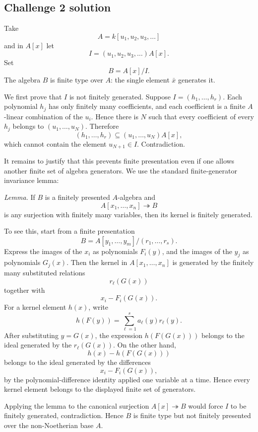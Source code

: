 \subsection*{Challenge 2 solution}
\begin{solution}
Take
\[
A=k[u_1,u_2,u_3,\ldots]
\]
and in \(A[x]\) let
\[
I=(u_1,u_2,u_3,\ldots)A[x].
\]
Set
\[
B=A[x]/I.
\]
The algebra \(B\) is finite type over \(A\): the single element \(\bar x\) generates it.

We first prove that \(I\) is not finitely generated.  Suppose \(I=(h_1,\ldots,h_r)\).  Each
polynomial \(h_j\) has only finitely many coefficients, and each coefficient is a finite
\(A\)-linear combination of the \(u_i\).  Hence there is \(N\) such that every coefficient of every
\(h_j\) belongs to \((u_1,\ldots,u_N)\).  Therefore
\[
(h_1,\ldots,h_r)\subseteq (u_1,\ldots,u_N)A[x],
\]
which cannot contain the element \(u_{N+1}\in I\).  Contradiction.

It remains to justify that this prevents finite presentation even if one allows another finite set
of algebra generators.  We use the standard finite-generator invariance lemma:

\emph{Lemma.} If \(B\) is a finitely presented \(A\)-algebra and
\[
A[x_1,\ldots,x_n]\twoheadrightarrow B
\]
is any surjection with finitely many variables, then its kernel is finitely generated.

To see this, start from a finite presentation
\[
B=A[y_1,\ldots,y_m]/(r_1,\ldots,r_s).
\]
Express the images of the \(x_i\) as polynomials \(F_i(y)\), and the images of the \(y_j\) as
polynomials \(G_j(x)\).  Then the kernel in \(A[x_1,\ldots,x_n]\) is generated by the finitely many
substituted relations
\[
r_\ell(G(x))
\]
together with
\[
x_i-F_i(G(x)).
\]
For a kernel element \(h(x)\), write
\[
h(F(y))=\sum_{\ell=1}^s a_\ell(y)r_\ell(y).
\]
After substituting \(y=G(x)\), the expression \(h(F(G(x)))\) belongs to the ideal generated by
the \(r_\ell(G(x))\).  On the other hand,
\[
h(x)-h(F(G(x)))
\]
belongs to the ideal generated by the differences
\[
x_i-F_i(G(x)),
\]
by the polynomial-difference identity applied one variable at a time.  Hence every kernel element
belongs to the displayed finite set of generators.

Applying the lemma to the canonical surjection \(A[x]\twoheadrightarrow B\) would force \(I\) to be
finitely generated, contradiction.  Hence \(B\) is finite type but not finitely presented over
the non-Noetherian base \(A\).
\end{solution}

